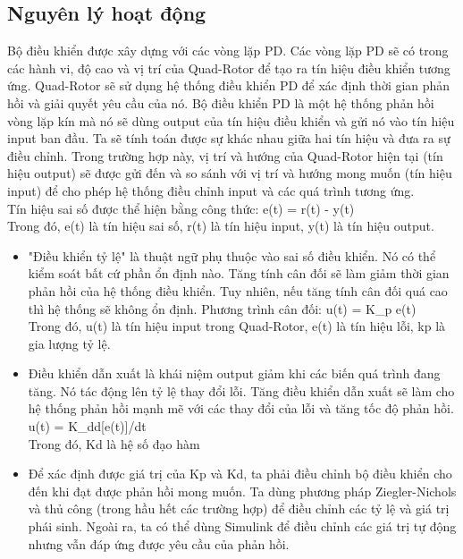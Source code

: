 {            \subsection{Nguyên lý hoạt động}
            Bộ điều khiển được xây dựng với các vòng lặp PD. Các vòng lặp PD sẽ có trong các hành vi, độ cao và vị trí của Quad-Rotor để tạo ra tín hiệu điều khiển tương ứng. Quad-Rotor sẽ sử dụng hệ thống điều khiển PD để xác định thời gian phản hồi và giải quyết yêu cầu của nó. Bộ điều khiển PD là một hệ thống phản hồi vòng lặp kín mà nó sẽ dùng output của tín hiệu điều khiển và gửi nó vào tín hiệu input ban đầu. Ta sẽ tính toán được sự khác nhau giữa hai tín hiệu và đưa ra sự điều chỉnh. Trong trường hợp này, vị trí và hướng của Quad-Rotor hiện tại (tín hiệu output) sẽ được gửi đến và so sánh với vị trí và hướng mong muốn (tín hiệu input) để cho phép hệ thống điều chỉnh input và các quá trình tương ứng.
\\
			Tín hiệu sai số được thể hiện bằng công thức: e(t) = r(t) - y(t)
\\
			Trong đó, e(t) là tín hiệu sai số, r(t) là tín hiệu input, y(t) là tín hiệu output.
			\begin{itemize}
			\item "Điều khiển tỷ lệ" là thuật ngữ phụ thuộc vào sai số điều khiển. Nó có thể kiểm soát bất cứ phần ổn định nào. Tăng tính cân đối sẽ làm giảm thời gian phản hồi của hệ thống điều khiển. Tuy nhiên, nếu tăng tính cân đối quá cao thì hệ thống sẽ không ổn định. Phương trình cân đối: u(t) = K_p e(t)
\\
Trong đó, u(t) là tín hiệu input trong Quad-Rotor, e(t) là tín hiệu lỗi, kp là gia lượng tỷ lệ.
			\item Điều khiển dẫn xuất là khái niệm output giảm khi các biến quá trình đang tăng. Nó tác động lên tỷ lệ thay đổi lỗi. Tăng điều khiển dẫn xuất sẽ làm cho hệ thống phản hồi mạnh mẽ với các thay đổi của lỗi và tăng tốc độ phản hồi.
			\\
			u(t) = K_dd[e(t)]/dt
			\\
			Trong đó, Kd là hệ số đạo hàm
			\item Để xác định được giá trị của Kp và Kd, ta phải điều chỉnh bộ điều khiển cho đến khi đạt được  phản hồi mong muốn. Ta dùng phương pháp Ziegler-Nichols và thủ công (trong hầu hết các trường hợp) để điều chỉnh các tỷ lệ và giá trị phái sinh. Ngoài ra, ta có thể dùng Simulink để điều chỉnh các giá trị tự động nhưng vẫn đáp ứng được yêu cầu của phản hồi.
			\end{itemize}
}
